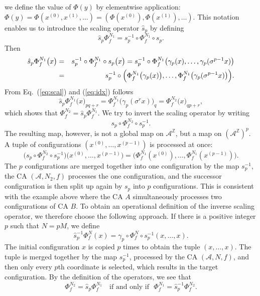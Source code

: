 \documentclass[a4paper]{article}
\begin{document}
we define
the value of $\Phi(y)$ by elementwise application:
$ \Phi (y) = \Phi(x^{(0)}, x^{(1)}, \ldots) = (\Phi(x^{(0)}), \Phi(x^{(1)}), \ldots)$.
This notation enables us to introduce the scaling operator $\hat{s}_p$
by defining
\[
\hat{s}_p \Phi^{N_1}_f = s^{-1}_p \circ \Phi^{N_1}_f \circ s_p.
\]
Then
\begin{eqnarray*}
\hat{s}_p \Phi^{N_1}_f\bigl(x\bigr) & = & s_p^{-1} \circ \Phi^{N_1}_f \circ s_p \bigl(x\bigr)
= s_p^{-1} \circ \Phi^{N_1}_f \bigl(\gamma_p(x), \ldots, \gamma_p(\sigma^{p-1} x)\bigr) \\
& = & s_p^{-1} \circ  \Bigl(\Phi^{N_1}_f\bigl(\gamma_p(x)\bigr), \ldots, \Phi^{N_1}_f\bigl(\gamma_p(\sigma^{p-1} x)\bigr)
\Bigr). \\
\end{eqnarray*}
From Eq.~(\ref{eq:scal}) and (\ref{eq:idx}) follows
\[
\hat{s}_p \Phi^{N_1}_f\bigl(x\bigr)_{pq+r} = \Phi^{N_1}_f\bigl(\gamma_p(\sigma^{r} x)\bigr)_q
= \Phi^{N_2}_f\bigl(x\bigr)_{qp+r},
\]
which shows that $\Phi^{N_2}_f = \hat{s}_p \Phi^{N_1}_f$.
We try to invert the scaling operator by writing
\[
s_p \circ \Phi^{N_2}_f \circ s^{-1}_p.
\]
The resulting map, however, is not a global map on $\mathcal{A}^\mathbb{Z}$,
but a map on $(\mathcal{A}^\mathbb{Z})^p$.
A tuple of configurations $(x^{(0)}, \ldots, x^{(p-1)})$ is processed at once:
\[
\bigl(s_p \circ \Phi^{N_2}_f \circ s^{-1}_p \bigr) \bigl(x^{(0)}, \ldots, x^{(p-1)}\bigr)
= \bigl(\Phi^{N_1}_f(x^{(0)}), \ldots, \Phi^{N_1}_f(x^{(p-1)})\bigr).
\]
The $p$ configurations are merged together into one configuration by the map $s^{-1}_p$, the
CA $(\mathcal{A}, N_2, f)$ processes the one configuration,
and the successor configuration is then split up again by $s_p$ into $p$ configurations.
This is consistent with the example above where the CA $A$ simultaneously processes
two configurations of CA $B$.
To obtain an operational definition of the inverse scaling operator, we
therefore choose the following approach.
If there is a positive integer $p$ such that $N = pM$, we define
\[
\hat{s}^{-1}_p \Phi^{N}_f (x) = \gamma_p \circ \Phi^{N}_f \circ s^{-1}_p(x, \ldots, x).
\]
The initial configuration $x$ is copied $p$ times to obtain the tuple $(x, \ldots, x)$.
The tuple is merged together by the map $s^{-1}_p$, processed by the CA $(\mathcal{A}, N, f)$, and
then only every $p$th coordinate is selected, which results in the target configuration.
By the definition of the operators, we see that
\[
\Phi^{N_2}_f = \hat{s}_p \Phi^{N_1}_f \ \ \ \mbox{ if and only if} \ \ \
\Phi^{N_1}_f = \hat{s}^{-1}_p \Phi^{N_2}_f.
\]
\end{document}
